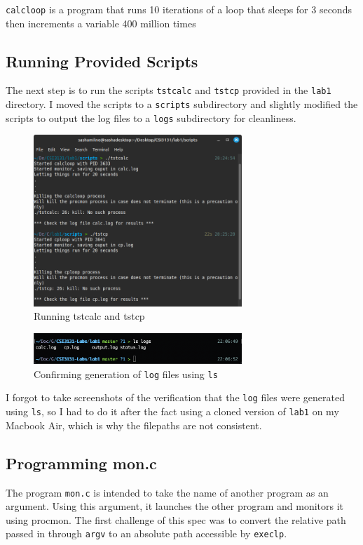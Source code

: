 \noindent
\texttt{calcloop} is a program that runs 10 iterations of a loop that sleeps
for 3 seconds then increments a variable 400 million times

\subsection{Running Provided Scripts}\label{subsec:running-provided-scripts}
The next step is to run the scripts \texttt{tstcalc} and \texttt{tstcp} provided
in the \texttt{lab1} directory.
I moved the scripts to a \texttt{scripts} subdirectory and slightly modified the
scripts to output the log files to a \texttt{logs} subdirectory for cleanliness.
\begin{figure}[H]
    \centering
    \includegraphics[width=0.7\textwidth]{../../screenshots/step7-scripts}
    \caption{Running tstcalc and tstcp}
    \label{fig:step7-scripts}
\end{figure}
\begin{figure}[H]
    \centering
    \includegraphics[width=0.7\textwidth]{../../screenshots/step7-ls}
    \caption{Confirming generation of \texttt{log} files using \texttt{ls}}
    \label{fig:step7-ls}
\end{figure}
\noindent
I forgot to take screenshots of the verification that the \texttt{log} files
were generated using \texttt{ls}, so I had to do it after the fact using a cloned
version of \texttt{lab1} on my Macbook Air, which is why the filepaths are not consistent.

\subsection{Programming mon.c}\label{subsec:programming-mon.c}
The program \texttt{mon.c} is intended to take the name of another program as an argument.
Using this argument, it launches the other program and monitors it using procmon.
The first challenge of this spec was to convert the relative path
passed in through \texttt{argv} to an absolute path accessible by \texttt{execlp}.

